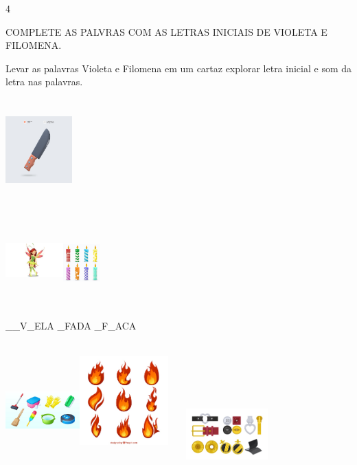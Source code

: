 {\num{4}\

COMPLETE AS PALVRAS COM AS LETRAS INICIAIS DE VIOLETA E FILOMENA.

Levar as palavras Violeta e Filomena em um cartaz explorar letra inicial
e som da letra nas palavras.

\includegraphics[width=1.01042in,height=1.55278in]{media/image7.jpeg}

\includegraphics[width=0.87500in,height=1.40486in]{media/image8.jpeg}\includegraphics[width=0.56250in,height=1.32083in]{media/image9.jpeg}

\_\_V\_ELA \_FADA \_F\_ACA

\includegraphics[width=1.12500in,height=1.48958in]{media/image10.jpeg}\includegraphics[width=1.34375in,height=1.77083in]{media/image11.jpeg}\includegraphics[width=1.77847in,height=0.76369in]{media/image12.jpeg}

}
